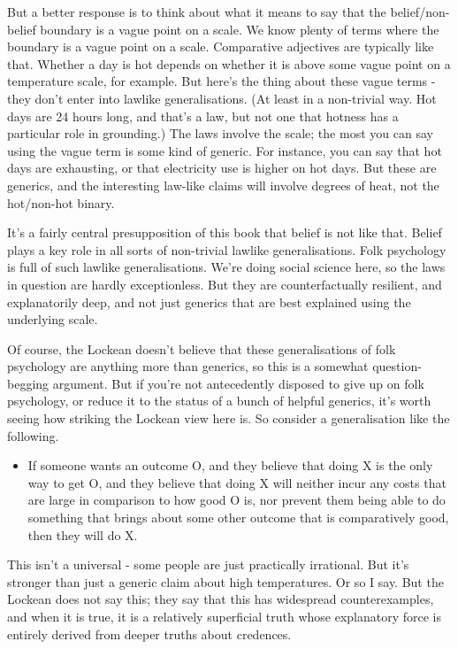 \documentclass[11pt,]{book}
\providecommand{\tightlist}{%
  \setlength{\itemsep}{0pt}\setlength{\parskip}{0pt}}
\begin{document}
But a better response is to think about what it means to say that the belief/non-belief boundary is a vague point on a scale. We know plenty of terms where the boundary is a vague point on a scale. Comparative adjectives are typically like that. Whether a day is hot depends on whether it is above some vague point on a temperature scale, for example. But here's the thing about these vague terms - they don't enter into lawlike generalisations. (At least in a non-trivial way. Hot days are 24 hours long, and that's a law, but not one that hotness has a particular role in grounding.) The laws involve the scale; the most you can say using the vague term is some kind of generic. For instance, you can say that hot days are exhausting, or that electricity use is higher on hot days. But these are generics, and the interesting law-like claims will involve degrees of heat, not the hot/non-hot binary.

It's a fairly central presupposition of this book that belief is not like that. Belief plays a key role in all sorts of non-trivial lawlike generalisations. Folk psychology is full of such lawlike generalisations. We're doing social science here, so the laws in question are hardly exceptionless. But they are counterfactually resilient, and explanatorily deep, and not just generics that are best explained using the underlying scale.

Of course, the Lockean doesn't believe that these generalisations of folk psychology are anything more than generics, so this is a somewhat question-begging argument. But if you're not antecedently disposed to give up on folk psychology, or reduce it to the status of a bunch of helpful generics, it's worth seeing how striking the Lockean view here is. So consider a generalisation like the following.

\begin{itemize}
\tightlist
\item
  If someone wants an outcome O, and they believe that doing X is the only way to get O, and they believe that doing X will neither incur any costs that are large in comparison to how good O is, nor prevent them being able to do something that brings about some other outcome that is comparatively good, then they will do X.
\end{itemize}

This isn't a universal - some people are just practically irrational. But it's stronger than just a generic claim about high temperatures. Or so I say. But the Lockean does not say this; they say that this has widespread counterexamples, and when it is true, it is a relatively superficial truth whose explanatory force is entirely derived from deeper truths about credences.
\end{document}
